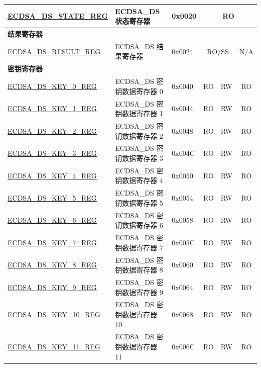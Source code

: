 \begin{small}
\begin{longtable}{ | p{5.2cm} | l | p{1.3cm} | l | l | l | l | }
\hyperref[regdesc:ECDSADSSTATEREG]{ECDSA\_DS\_STATE\_REG} & ECDSA\_DS 状态寄存器 & 0x0020 & \multicolumn{4}{|c|}{RO} \\ \hline
\multicolumn{7}{|l|}{\textbf{结果寄存器}} \\ \hline
\hyperref[regdesc:ECDSADSRESULTREG]{ECDSA\_DS\_RESULT\_REG} & ECDSA\_DS 结果寄存器 & 0x0024 & \multicolumn{3}{|c|}{RO/SS} & N/A \\ \hline
\multicolumn{7}{|l|}{\textbf{密钥寄存器}} \\ \hline
\hyperref[regdesc:ECDSADSKEY0REG]{ECDSA\_DS\_KEY\_0\_REG} & ECDSA\_DS 密钥数据寄存器 0 & 0x0040 & RO & RW &\multicolumn{2}{|c|}{RO} \\ \hline
\hyperref[regdesc:ECDSADSKEY1REG]{ECDSA\_DS\_KEY\_1\_REG} & ECDSA\_DS 密钥数据寄存器 1 & 0x0044 & RO & RW &\multicolumn{2}{|c|}{RO}  \\ \hline
\hyperref[regdesc:ECDSADSKEY2REG]{ECDSA\_DS\_KEY\_2\_REG} & ECDSA\_DS 密钥数据寄存器 2 & 0x0048 & RO & RW &\multicolumn{2}{|c|}{RO}  \\ \hline
\hyperref[regdesc:ECDSADSKEY3REG]{ECDSA\_DS\_KEY\_3\_REG} & ECDSA\_DS 密钥数据寄存器 3 & 0x004C & RO & RW &\multicolumn{2}{|c|}{RO}  \\ \hline
\hyperref[regdesc:ECDSADSKEY4REG]{ECDSA\_DS\_KEY\_4\_REG} & ECDSA\_DS 密钥数据寄存器 4 & 0x0050 & RO & RW &\multicolumn{2}{|c|}{RO}  \\ \hline
\hyperref[regdesc:ECDSADSKEY5REG]{ECDSA\_DS\_KEY\_5\_REG} & ECDSA\_DS 密钥数据寄存器 5 & 0x0054 & RO & RW &\multicolumn{2}{|c|}{RO}  \\ \hline
\hyperref[regdesc:ECDSADSKEY6REG]{ECDSA\_DS\_KEY\_6\_REG} & ECDSA\_DS 密钥数据寄存器 6 & 0x0058 & RO & RW &\multicolumn{2}{|c|}{RO}  \\ \hline
\hyperref[regdesc:ECDSADSKEY7REG]{ECDSA\_DS\_KEY\_7\_REG} & ECDSA\_DS 密钥数据寄存器 7 & 0x005C & RO & RW &\multicolumn{2}{|c|}{RO}  \\ \hline
\hyperref[regdesc:ECDSADSKEY8REG]{ECDSA\_DS\_KEY\_8\_REG} & ECDSA\_DS 密钥数据寄存器 8 & 0x0060 & RO & RW &\multicolumn{2}{|c|}{RO}  \\ \hline
\hyperref[regdesc:ECDSADSKEY9REG]{ECDSA\_DS\_KEY\_9\_REG} & ECDSA\_DS 密钥数据寄存器 9 & 0x0064 & RO & RW &\multicolumn{2}{|c|}{RO}  \\ \hline
\hyperref[regdesc:ECDSADSKEY10REG]{ECDSA\_DS\_KEY\_10\_REG} & ECDSA\_DS 密钥数据寄存器 10 & 0x0068 & RO & RW &\multicolumn{2}{|c|}{RO}  \\ \hline
\hyperref[regdesc:ECDSADSKEY11REG]{ECDSA\_DS\_KEY\_11\_REG} & ECDSA\_DS 密钥数据寄存器 11 & 0x006C & RO & RW &\multicolumn{2}{|c|}{RO}  \\ \hline

\end{longtable}
\end{small}
